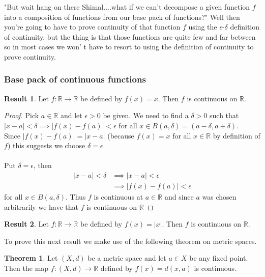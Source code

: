 \documentclass[12pt]{article}
\theoremstyle{definition}
\newtheorem{theorem}{Theorem}
\numberwithin{theorem}{subsection}
\numberwithin{corollary}{subsection}
\newtheorem{result}{Result}
\theoremstyle{remark}
\theoremstyle{point}
\begin{document}
	 "But wait hang on there Shimal....what if we can't decompose a given function $f$ into a composition of functions from our base pack of functions?" Well then you're going to have to prove continuity of that function $f$ using the $\epsilon$-$\delta$ definition of continuity, but the thing is that those functions are quite few and far between so in most cases we won' t have to resort to using the definition of continuity to prove continuity.
	 
	 \subsubsection{Base pack of continuous functions}
	 
	 \begin{result}
	 	Let $f : \mathbb{R} \to \mathbb{R}$ be defined by $f(x) = x$. Then $f$ is continuous on $\mathbb{R}$. 
	 \end{result}
	 
	 \begin{proof}
	 	Pick $a \in \mathbb{R}$ and let $\epsilon > 0$ be given. We need to find a $\delta > 0$ such that $|x-a| < \delta \implies |f(x)-f(a)| < \epsilon$ for all $x \in B(a, \delta) = (a- \delta, a+ \delta)$. \\
	 	
	 	Since $|f(x) - f(a)| = |x-a|$ (because $f(x) =  x$ for all $x \in \mathbb{R}$ by definition of $f$) this suggests we choose $\delta = \epsilon$. \\ \\
	 	Put $\delta = \epsilon$, then 	 	\begin{align*}	 	
		 	|x-a| < \delta &\implies |x-a| < \epsilon \\
		 	&\implies  |f(x) - f(a)| < \epsilon
	 	\end{align*}
	 	for all $x \in B(a, \delta)$. Thus $f$ is continuous at $a \in \mathbb{R}$ and since $a$ was chosen arbitrarily we have that $f$ is continuous on $\mathbb{R}$
	 \end{proof}
	 
	 \hrulefill
	 
	  \begin{result}
	  	Let $f : \mathbb{R} \to \mathbb{R}$ be defined by $f(x) = |x|$. Then $f$ is continuous on $\mathbb{R}$. 
	  \end{result}
	  
	  To prove this next result we make use of the following theorem on metric spaces.
	 
	 \begin{theorem}
	 	Let $(X, d)$ be a metric space and let $a \in X$ be any fixed point. Then the map $f : (X, d) \to \mathbb{R}$ defined by $f(x) = d(x, a)$ is continuous.
	 \end{theorem}
	 
\end{document}
